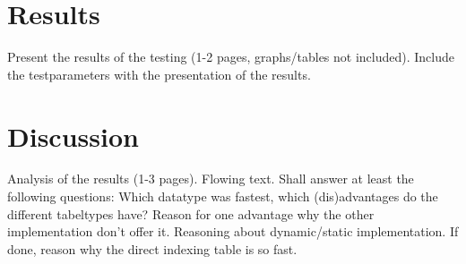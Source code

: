 \documentclass[a4paper,11pt,twoside]{article}
\begin{document}
\section{Results}
Present the results of the testing (1-2 pages, graphs/tables not
included). Include the testparameters with the presentation of the
results.



\section{Discussion}
Analysis of the results (1-3 pages). Flowing text. Shall answer at
least the following questions:
Which datatype was fastest, which (dis)advantages do the different
tabeltypes have? Reason for one advantage why the other implementation
don't offer it. Reasoning about dynamic/static implementation. If
done, reason why the direct indexing table is so fast.


\end{document}
